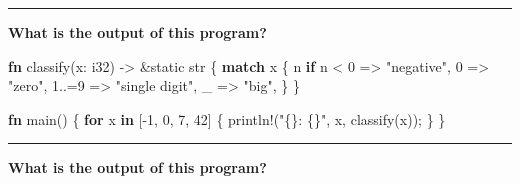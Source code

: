 \documentclass[
  11pt,
]{article}
\newenvironment{Shaded}{}{}
\newcommand{\ControlFlowTok}[1]{\textcolor[rgb]{0.00,0.44,0.13}{\textbf{#1}}}
\newcommand{\DataTypeTok}[1]{\textcolor[rgb]{0.56,0.13,0.00}{#1}}
\newcommand{\DecValTok}[1]{\textcolor[rgb]{0.25,0.63,0.44}{#1}}
\newcommand{\KeywordTok}[1]{\textcolor[rgb]{0.00,0.44,0.13}{\textbf{#1}}}
\newcommand{\NormalTok}[1]{#1}
\newcommand{\OperatorTok}[1]{\textcolor[rgb]{0.40,0.40,0.40}{#1}}
\newcommand{\OtherTok}[1]{\textcolor[rgb]{0.00,0.44,0.13}{#1}}
\newcommand{\PreprocessorTok}[1]{\textcolor[rgb]{0.74,0.48,0.00}{#1}}
\newcommand{\StringTok}[1]{\textcolor[rgb]{0.25,0.44,0.63}{#1}}
\begin{document}
\begin{center}\rule{0.5\linewidth}{0.5pt}\end{center}

\textbf{What is the output of this program?}

\begin{Shaded}
\begin{Highlighting}[]
\KeywordTok{fn}\NormalTok{ classify(x}\OperatorTok{:} \DataTypeTok{i32}\NormalTok{) }\OperatorTok{{-}\textgreater{}} \OperatorTok{\&}\OtherTok{\textquotesingle{}static} \DataTypeTok{str} \OperatorTok{\{}
    \ControlFlowTok{match}\NormalTok{ x }\OperatorTok{\{}
\NormalTok{        n }\ControlFlowTok{if}\NormalTok{ n }\OperatorTok{\textless{}} \DecValTok{0} \OperatorTok{=\textgreater{}} \StringTok{"negative"}\OperatorTok{,}
        \DecValTok{0} \OperatorTok{=\textgreater{}} \StringTok{"zero"}\OperatorTok{,}
        \DecValTok{1}\OperatorTok{..=}\DecValTok{9} \OperatorTok{=\textgreater{}} \StringTok{"single digit"}\OperatorTok{,}
\NormalTok{        \_ }\OperatorTok{=\textgreater{}} \StringTok{"big"}\OperatorTok{,}
    \OperatorTok{\}}
\OperatorTok{\}}

\KeywordTok{fn}\NormalTok{ main() }\OperatorTok{\{}
    \ControlFlowTok{for}\NormalTok{ x }\KeywordTok{in}\NormalTok{ [}\OperatorTok{{-}}\DecValTok{1}\OperatorTok{,} \DecValTok{0}\OperatorTok{,} \DecValTok{7}\OperatorTok{,} \DecValTok{42}\NormalTok{] }\OperatorTok{\{}
        \PreprocessorTok{println!}\NormalTok{(}\StringTok{"\{\}: \{\}"}\OperatorTok{,}\NormalTok{ x}\OperatorTok{,}\NormalTok{ classify(x))}\OperatorTok{;}
    \OperatorTok{\}}
\OperatorTok{\}}
\end{Highlighting}
\end{Shaded}

\begin{center}\rule{0.5\linewidth}{0.5pt}\end{center}

\textbf{What is the output of this program?}
\end{document}
